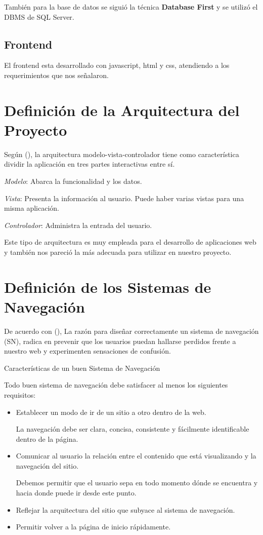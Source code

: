 	También para la base de datos se siguió la técnica \textbf{Database First} y se utilizó el DBMS de SQL Server.
	
\subsection{Frontend}
	El frontend esta desarrollado con javascript, html y css, atendiendo a los requerimientos que nos señalaron.
 

\section{Definición de la Arquitectura del Proyecto}

Según (\cite{huet-2023}), la arquitectura modelo-vista-controlador tiene como característica dividir la aplicación en tres partes interactivas entre sí.

\textit{Modelo}: Abarca la funcionalidad y los datos.

\textit{Vista}: Presenta la información al usuario. Puede haber varias vistas para una misma aplicación.

\textit{Controlador}: Administra la entrada del usuario.

Este tipo de arquitectura es muy empleada para el desarrollo de aplicaciones web y también nos pareció la más adecuada para utilizar en nuestro proyecto.



\section{Definición de los Sistemas de Navegación}

De acuerdo con (\cite{joven-2011}), La razón para diseñar correctamente un sistema de navegación (SN), radica en prevenir que los usuarios puedan hallarse perdidos frente a nuestro web y experimenten sensaciones de confusión.

Características de un buen Sistema de Navegación

Todo buen sistema de navegación debe satisfacer al menos los siguientes requisitos:

\begin{itemize}
	\item Establecer un modo de ir de un sitio a otro dentro de la web.
	
	La navegación debe ser clara, concisa, consistente y fácilmente identificable dentro de la página. 
	
	\item Comunicar al usuario la relación entre el contenido que está visualizando y la navegación del sitio.
	
	Debemos permitir que el usuario sepa en todo momento dónde se encuentra y hacia donde puede ir desde este punto.
	
	\item Reflejar la arquitectura del sitio que subyace al sistema de navegación.
	
	\item Permitir volver a la página de inicio rápidamente.
\end{itemize}

